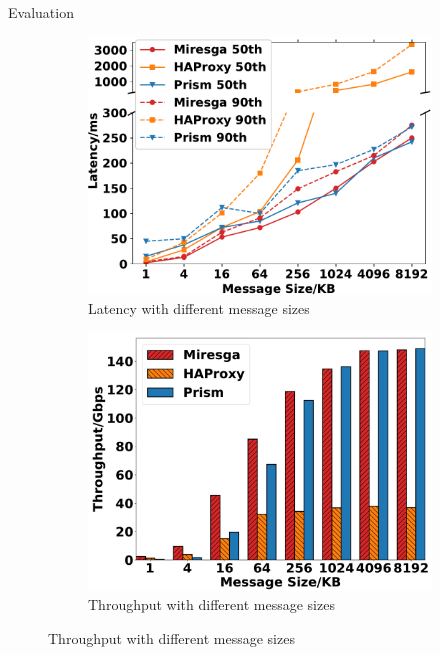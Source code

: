 \documentclass[final, 24pt]{beamer}
\newlength{\colwidth}
\begin{document}
\begin{frame}[t]
\begin{columns}[t]
\begin{column}{\colwidth}
\begin{block}{Evaluation}
\begin{figure}
        \centering
        \begin{subfigure}[h]{0.48\colwidth}
            \centering
            \includegraphics[width=\linewidth]{pic/latency.pdf}
            \caption{Latency with different message sizes}
            \label{fig:fixed_lantency}
        \end{subfigure}
        \begin{subfigure}[h]{0.48\colwidth}
            \centering
            \includegraphics[width=\linewidth]{pic/throughput.pdf}
            \caption{Throughput with different message sizes}
            \label{fig:fixed_throughput}
        \end{subfigure}
        

\end{figure}
\end{block}
\end{column}
\end{columns}
\end{frame}
\end{document}
